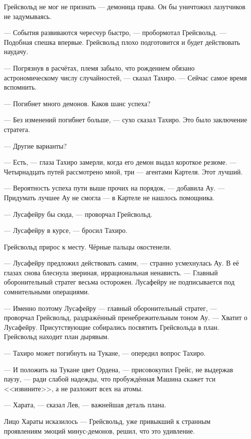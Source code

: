 Грейсвольд не мог не признать --- демоница права.
Он бы уничтожил лазутчиков не задумываясь.

--- События развиваются чересчур быстро, --- пробормотал Грейсвольд.
--- Подобная спешка впервые.
Грейсвольд плохо подготовится и будет действовать наудачу.

--- Погрязнув в расчётах, племя забыло, что рождением обязано астрономическому числу случайностей, --- сказал Тахиро.
--- Сейчас самое время вспомнить.

--- Погибнет много демонов.
Каков шанс успеха?

--- Без изменений погибнет больше, --- сухо сказал Тахиро.
Это было заключение стратега.

--- Другие варианты?

--- Есть, --- глаза Тахиро замерли, когда его демон выдал короткое резюме.
--- Четырнадцать путей рассмотрено мной, три --- агентами Картеля.
Этот лучший.

--- Вероятность успеха пути выше прочих на порядок, --- добавила Ау.
--- Придумать лучшее Ау не смогла --- в Картеле не нашлось помощника.

--- Лусафейру бы сюда, --- проворчал Грейсвольд.

--- Лусафейру в курсе, --- бросил Тахиро.

Грейсвольд прирос к месту.
Чёрные пальцы окостенели.

--- Лусафейру предложил действовать самим, --- странно усмехнулась Ау.
В её глазах снова блеснула звериная, иррациональная ненависть.
--- Главный оборонительный стратег весьма осторожен.
Лусафейру не подписывается под сомнительными операциями.

--- Именно поэтому Лусафейру --- главный оборонительный стратег, --- проворчал Грейсвольд, раздражённый пренебрежительным тоном Ау.
--- Хватит о Лусафейру.
Присутствующие собирались посвятить Грейсвольда в план.
Грейсвольд находит план дырявым.

--- Тахиро может погибнуть на Тукане, --- опередил вопрос Тахиро.

--- И положить на Тукане цвет Ордена, --- присовокупил Грейс, не выдержав паузу, --- ради слабой надежды, что пробуждённая Машина скажет тси <<извините>>, а не разложит всех на атомы.

--- Харата, --- сказал Лев, --- важнейшая деталь плана.

Лицо Хараты исказилось --- Грейсвольд, уже привыкший к странным проявлениям эмоций минус-демонов, решил, что это удивление.

